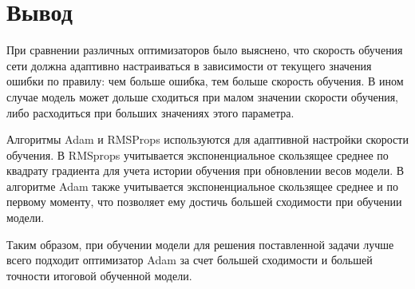 
\section{Вывод}
При сравнении различных оптимизаторов было выяснено, что скорость обучения сети должна адаптивно настраиваться в зависимости от текущего значения ошибки по правилу: чем больше ошибка, тем больше скорость обучения. В ином случае модель может дольше сходиться при малом значении скорости обучения, либо расходиться при больших значениях этого параметра.

Алгоритмы Adam и RMSProps используются для адаптивной настройки скорости обучения. В RMSprops учитывается экспоненциальное скользящее среднее по квадрату градиента для учета истории обучения при обновлении весов модели. В алгоритме Adam также учитывается экспоненциальное скользящее среднее и по первому моменту, что позволяет ему достичь большей сходимости при обучении модели.

Таким образом, при обучении модели для решения поставленной задачи лучше всего подходит оптимизатор Adam за счет большей сходимости и большей точности итоговой обученной модели.